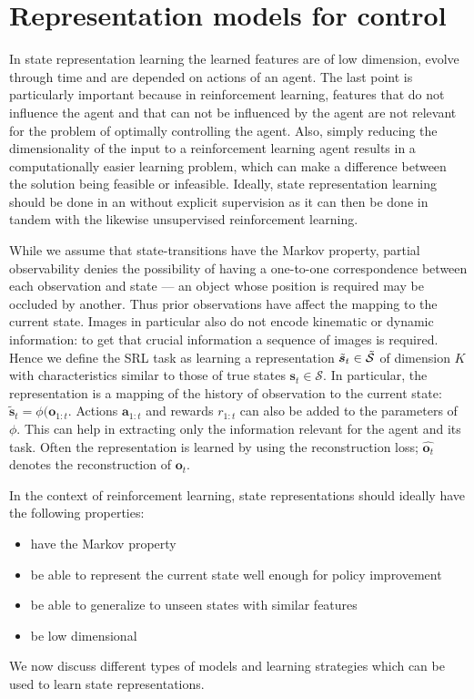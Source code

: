 

\section{Representation models for control}
\label{sec-srl-for-control}
In state representation learning the learned features
are of low dimension, evolve through time and are depended
on actions of an agent.
The last point is particularly important because in reinforcement learning,
features that do not influence the agent and that can not be influenced
by the agent are not relevant for the problem of optimally controlling the agent.
Also, simply reducing the dimensionality of the input to a reinforcement learning
agent results in a computationally easier learning problem,
which can make a difference between the solution being feasible or infeasible.
Ideally, state  representation learning should be done in an without explicit supervision
as it can then be done in tandem with the likewise unsupervised reinforcement learning.

While we assume that state-transitions have the Markov property,
partial observability denies the possibility of having a one-to-one
correspondence between each observation and state ---
an object whose position is required may be occluded by another.
Thus prior observations have affect the mapping to the current state.
Images in particular also do not encode kinematic or dynamic information:
to get that crucial information a sequence of images is required.
Hence we define the SRL task as learning
a representation $ \tilde{\bm{s}}_{t} \in \tilde{\cal{S}}  $ of dimension $ K  $
with characteristics similar to those of true states $ \bm{s}_{t} \in \mathcal{S} $.
In particular, the representation is a mapping of the history of 
observation to the current state: $ \tilde{\bm{s}}_{t} = \phi(\bm{o}_{1:t}  $.
Actions $ \bm{a}_{1:t}  $ and rewards $ r_{ 1:t }  $ can also be added
to the parameters of $ \phi  $.
This can help in extracting only the information relevant for the agent and its task.
Often the representation is learned by using the reconstruction loss;
$ \hat{\bm{o}_{t}}  $ denotes the reconstruction of $ \bm{o}_{t}  $.

In the context of reinforcement learning, state representations should
ideally have the following properties:
\begin{itemize}
		\item have the Markov property 
		\item be able to represent the current state well enough for policy improvement
		\item be able to generalize to unseen states with similar features
		\item be low dimensional
\end{itemize}
We now discuss different types of models and learning strategies which 
can be used to learn state representations.

